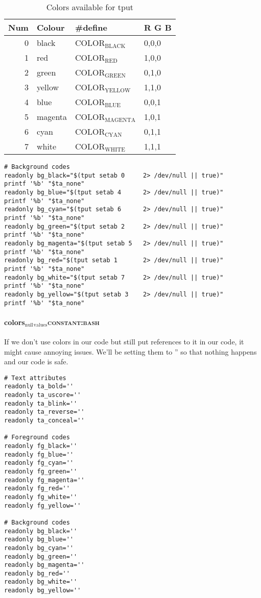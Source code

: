 \documentclass[11pt]{article}
\begin{document}
\begin{table}[htbp]
\caption{Colors available for tput}
\centering
\begin{tabular}{rlll}
\hline
Num & Colour & \#define & R G B\\
\hline
0 & black & COLOR\(_{\text{BLACK}}\) & 0,0,0\\
1 & red & COLOR\(_{\text{RED}}\) & 1,0,0\\
2 & green & COLOR\(_{\text{GREEN}}\) & 0,1,0\\
3 & yellow & COLOR\(_{\text{YELLOW}}\) & 1,1,0\\
4 & blue & COLOR\(_{\text{BLUE}}\) & 0,0,1\\
5 & magenta & COLOR\(_{\text{MAGENTA}}\) & 1,0,1\\
6 & cyan & COLOR\(_{\text{CYAN}}\) & 0,1,1\\
7 & white & COLOR\(_{\text{WHITE}}\) & 1,1,1\\
\hline
\end{tabular}
\end{table}

\begin{verbatim}
# Background codes
readonly bg_black="$(tput setab 0     2> /dev/null || true)"
printf '%b' "$ta_none"
readonly bg_blue="$(tput setab 4      2> /dev/null || true)"
printf '%b' "$ta_none"
readonly bg_cyan="$(tput setab 6      2> /dev/null || true)"
printf '%b' "$ta_none"
readonly bg_green="$(tput setab 2     2> /dev/null || true)"
printf '%b' "$ta_none"
readonly bg_magenta="$(tput setab 5   2> /dev/null || true)"
printf '%b' "$ta_none"
readonly bg_red="$(tput setab 1       2> /dev/null || true)"
printf '%b' "$ta_none"
readonly bg_white="$(tput setab 7     2> /dev/null || true)"
printf '%b' "$ta_none"
readonly bg_yellow="$(tput setab 3    2> /dev/null || true)"
printf '%b' "$ta_none"
\end{verbatim}

\paragraph{colors\(_{\text{null}}\)\(_{\text{values}}\)\hfill{}\textsc{constant:bash}}
\label{sec:org398b5e4}
If we don't use colors in our code but still put references to it in our code, it might cause annoying issues.
We'll be setting them to '' so that nothing happens and our code is safe.
\begin{verbatim}
# Text attributes
readonly ta_bold=''
readonly ta_uscore=''
readonly ta_blink=''
readonly ta_reverse=''
readonly ta_conceal=''

# Foreground codes
readonly fg_black=''
readonly fg_blue=''
readonly fg_cyan=''
readonly fg_green=''
readonly fg_magenta=''
readonly fg_red=''
readonly fg_white=''
readonly fg_yellow=''

# Background codes
readonly bg_black=''
readonly bg_blue=''
readonly bg_cyan=''
readonly bg_green=''
readonly bg_magenta=''
readonly bg_red=''
readonly bg_white=''
readonly bg_yellow=''
\end{verbatim}
\end{document}
